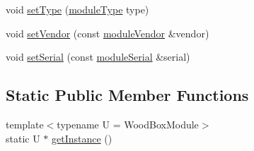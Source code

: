 \begin{DoxyCompactItemize}
\item 
void \mbox{\hyperlink{classwood_box_1_1module_1_1_wood_box_module_a807efbd90ccdd796bfc62c15bfbc81ab}{set\+Type}} (\mbox{\hyperlink{classwood_box_1_1module_1_1_wood_box_module_af74476c8a785de7fe587c4fb68435673}{module\+Type}} type)
\item 
void \mbox{\hyperlink{classwood_box_1_1module_1_1_wood_box_module_af19696ed5702e009a584065892ed1501}{set\+Vendor}} (const \mbox{\hyperlink{classwood_box_1_1module_1_1_wood_box_module_adf5d59bae2980ff138284d0fa885df19}{module\+Vendor}} \&vendor)
\item 
void \mbox{\hyperlink{classwood_box_1_1module_1_1_wood_box_module_affcbb54be4585637a88aade3e29b8a93}{set\+Serial}} (const \mbox{\hyperlink{classwood_box_1_1module_1_1_wood_box_module_a3a6503bbd5147a06ba50081f97177b46}{module\+Serial}} \&serial)
\end{DoxyCompactItemize}
\subsection*{Static Public Member Functions}
\begin{DoxyCompactItemize}
\item 
{\footnotesize template$<$typename U  = Wood\+Box\+Module$>$ }\\static U $\ast$ \mbox{\hyperlink{classwood_box_1_1module_1_1_wood_box_module_a3f13bd3a6318ddf2a7db84f86b198a49}{get\+Instance}} ()
\end{DoxyCompactItemize}
